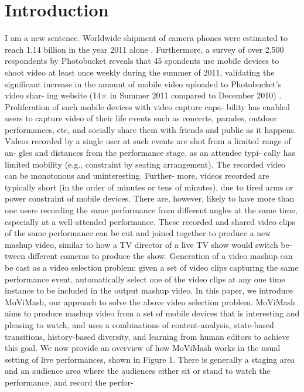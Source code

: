 \documentclass{sig-alternate}
\begin{document}
\section{Introduction}
I am a new sentence.
Worldwide shipment of camera phones were estimated to reach
1.14 billion in the year 2011 alone \cite{salas:one}. Furthermore, a survey of
over 2,500 respondents by Photobucket reveals that 45%
spondents use mobile devices to shoot video at least once weekly
during the summer of 2011, validating the significant increase in
the amount of mobile video uploaded to Photobucket’s video shar-
ing website (14× in Summer 2011 compared to December 2010) \cite{salas:two}.
Proliferation of such mobile devices with video capture capa-
bility has enabled users to capture video of their life events such
as concerts, parades, outdoor performances, etc, and socially share
them with friends and public as it happens. Videos recorded by
a single user at such events are shot from a limited range of an-
gles and distances from the performance stage, as an attendee typi-
cally has limited mobility (e.g., constraint by seating arrangement).
The recorded video can be monotonous and uninteresting. Further-
more, videos recorded are typically short (in the order of minutes
or tens of minutes), due to tired arms or power constraint of mobile
devices. There are, however, likely to have more than one users
recording the same performance from different angles at the same
time, especially at a well-attended performance.
These recorded and shared video clips of the same performance
can be cut and joined together to produce a new mashup video,
similar to how a TV director of a live TV show would switch be-
tween different cameras to produce the show. Generation of a video
mashup can be cast as a video selection problem: given a set of
video clips capturing the same performance event, automatically
select one of the video clips at any one time instance to be included
in the output mashup video.
In this paper, we introduce MoViMash, our approach to solve
the above video selection problem. MoViMash aims to produce
mashup video from a set of mobile devices that is interesting and
pleasing to watch, and uses a combinations of content-analysis,
state-based transitions, history-based diversity, and learning from
human editors to achieve this goal.
We now provide an overview of how MoViMash works in the
usual setting of live performances, shown in Figure 1. There is
generally a staging area and an audience area where the audiences
either sit or stand to watch the performance, and record the perfor-
\end{document}
